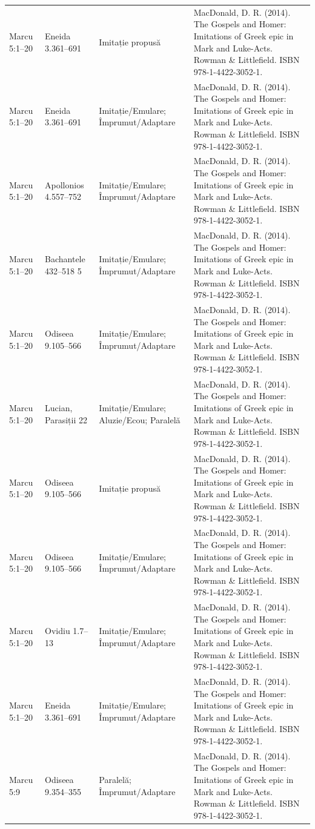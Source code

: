 \documentclass[12pt,a4paper,twoside,openany]{book}
\begin{document}
\begin{longtable}{L{1.4cm}L{1.7cm}L{3.1cm}L{8.4cm}}
Marcu 5:1–20 & Eneida 3.361–691 & Imitație propusă & MacDonald, D. R. (2014). The Gospels and Homer: Imitations of Greek epic in Mark and Luke-Acts. Rowman \& Littlefield. ISBN 978-1-4422-3052-1. \\
Marcu 5:1–20 & Eneida 3.361–691 & Imitație/Emulare; Împrumut/Adaptare & MacDonald, D. R. (2014). The Gospels and Homer: Imitations of Greek epic in Mark and Luke-Acts. Rowman \& Littlefield. ISBN 978-1-4422-3052-1. \\
Marcu 5:1–20 & Apollonios 4.557–752 & Imitație/Emulare; Împrumut/Adaptare & MacDonald, D. R. (2014). The Gospels and Homer: Imitations of Greek epic in Mark and Luke-Acts. Rowman \& Littlefield. ISBN 978-1-4422-3052-1. \\
Marcu 5:1–20 & Bachantele 432–518 5 & Imitație/Emulare; Împrumut/Adaptare & MacDonald, D. R. (2014). The Gospels and Homer: Imitations of Greek epic in Mark and Luke-Acts. Rowman \& Littlefield. ISBN 978-1-4422-3052-1. \\
Marcu 5:1–20 & Odiseea 9.105–566 & Imitație/Emulare; Împrumut/Adaptare & MacDonald, D. R. (2014). The Gospels and Homer: Imitations of Greek epic in Mark and Luke-Acts. Rowman \& Littlefield. ISBN 978-1-4422-3052-1. \\
Marcu 5:1–20 & Lucian, Parasiții 22 & Imitație/Emulare; Aluzie/Ecou; Paralelă & MacDonald, D. R. (2014). The Gospels and Homer: Imitations of Greek epic in Mark and Luke-Acts. Rowman \& Littlefield. ISBN 978-1-4422-3052-1. \\
Marcu 5:1–20 & Odiseea 9.105–566 & Imitație propusă & MacDonald, D. R. (2014). The Gospels and Homer: Imitations of Greek epic in Mark and Luke-Acts. Rowman \& Littlefield. ISBN 978-1-4422-3052-1. \\
Marcu 5:1–20 & Odiseea 9.105–566 & Imitație/Emulare; Împrumut/Adaptare & MacDonald, D. R. (2014). The Gospels and Homer: Imitations of Greek epic in Mark and Luke-Acts. Rowman \& Littlefield. ISBN 978-1-4422-3052-1. \\
Marcu 5:1–20 & Ovidiu 1.7–13 & Imitație/Emulare; Împrumut/Adaptare & MacDonald, D. R. (2014). The Gospels and Homer: Imitations of Greek epic in Mark and Luke-Acts. Rowman \& Littlefield. ISBN 978-1-4422-3052-1. \\
Marcu 5:1–20 & Eneida 3.361–691 & Imitație/Emulare; Împrumut/Adaptare & MacDonald, D. R. (2014). The Gospels and Homer: Imitations of Greek epic in Mark and Luke-Acts. Rowman \& Littlefield. ISBN 978-1-4422-3052-1. \\
Marcu 5:9 & Odiseea 9.354–355 & Paralelă; Împrumut/Adaptare & MacDonald, D. R. (2014). The Gospels and Homer: Imitations of Greek epic in Mark and Luke-Acts. Rowman \& Littlefield. ISBN 978-1-4422-3052-1. \\

\end{longtable}
\end{document}
